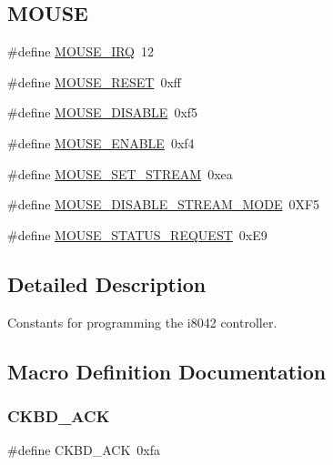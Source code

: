 \subsection*{M\+O\+U\+SE}
\begin{DoxyCompactItemize}
\item 
\#define \hyperlink{group__i8042_ga85964cb90343bb1a029b1d1b4229f910}{M\+O\+U\+S\+E\+\_\+\+I\+RQ}~12
\item 
\#define \hyperlink{group__i8042_ga6b902000c4f0a66e57f0eb78d7611105}{M\+O\+U\+S\+E\+\_\+\+R\+E\+S\+ET}~0xff
\item 
\#define \hyperlink{group__i8042_ga094907f521b569f790a760be8885ec4d}{M\+O\+U\+S\+E\+\_\+\+D\+I\+S\+A\+B\+LE}~0xf5
\item 
\#define \hyperlink{group__i8042_ga4e6aa8d10e05b5f94c196bfe2cdfb8d7}{M\+O\+U\+S\+E\+\_\+\+E\+N\+A\+B\+LE}~0xf4
\item 
\#define \hyperlink{group__i8042_gafcda52e19d0d6e3053ec9e51c548254d}{M\+O\+U\+S\+E\+\_\+\+S\+E\+T\+\_\+\+S\+T\+R\+E\+AM}~0xea
\item 
\#define \hyperlink{group__i8042_gadb427fdde0b4b8715e843c54e1ae7522}{M\+O\+U\+S\+E\+\_\+\+D\+I\+S\+A\+B\+L\+E\+\_\+\+S\+T\+R\+E\+A\+M\+\_\+\+M\+O\+DE}~0\+X\+F5
\item 
\#define \hyperlink{group__i8042_gae81dac725cb48935cbc4564c35a46c5d}{M\+O\+U\+S\+E\+\_\+\+S\+T\+A\+T\+U\+S\+\_\+\+R\+E\+Q\+U\+E\+ST}~0x\+E9
\end{DoxyCompactItemize}


\subsection{Detailed Description}
Constants for programming the i8042 controller. 

\subsection{Macro Definition Documentation}
\hypertarget{group__i8042_ga7bff22c3c71947a24f8f0922d33f0f5f}{}\label{group__i8042_ga7bff22c3c71947a24f8f0922d33f0f5f} 
\subsubsection{\texorpdfstring{C\+K\+B\+D\+\_\+\+A\+CK}{CKBD\_ACK}}
{\footnotesize\ttfamily \#define C\+K\+B\+D\+\_\+\+A\+CK~0xfa}

